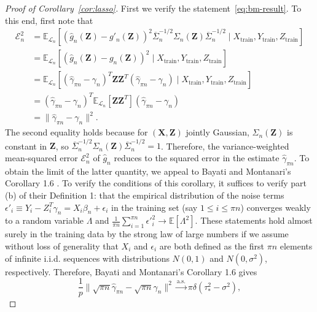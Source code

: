 \documentclass[12pt]{article}
\theoremstyle{definition}
\theoremstyle{remark}
\newcommand{\eps}{\epsilon}
\newcommand{\prx}{\bm X}
\newcommand{\srx}{X}
\newcommand{\prz}{\bm Z}
\newcommand{\srz}{Z}
\newcommand{\sry}{Y}
\newcommand{\seps}{\epsilon}
\begin{document}
\begin{proof}[Proof of Corollary~\ref{cor:lasso}]

First we verify the statement~\eqref{eq:bm-result}. To this end, first note that
\begin{equation}
	\begin{split}
		\mathcal E_n^2 &=  \mathbb E_{\mathcal L_n}[(\widehat g_n(\prz) - g'_n(\prz))^2\overline \Sigma_n^{-1/2}\Sigma_n(\prz)\overline \Sigma_n^{-1/2} \mid \srx_{\text{train}}, \sry_{\text{train}}, \srz_{\text{train}}] \\
		&= \mathbb E_{\mathcal L_n}[(\widehat g_n(\prz) - g_n(\prz))^2 \mid \srx_{\text{train}}, \sry_{\text{train}}, \srz_{\text{train}}] \\
		&= \mathbb E_{\mathcal L_n}[(\widehat \gamma_{\pi n} - \gamma_n)^T \prz \prz^T (\widehat \gamma_{\pi n} - \gamma_n) \mid \srx_{\text{train}}, \sry_{\text{train}}, \srz_{\text{train}}] \\
		&= (\widehat \gamma_{\pi n} - \gamma_n)^T\mathbb E_{\mathcal L_n}[ \prz \prz^T](\widehat \gamma_{\pi n} - \gamma_n) \\
		&= \|\widehat \gamma_{\pi n} - \gamma_n\|^2.
		\label{eq:error}
	\end{split}
\end{equation}
The second equality holds because for $(\prx, \prz)$ jointly Gaussian, $\Sigma_n(\prz)$ is constant in $\prz$, so $\overline \Sigma_n^{-1/2}\Sigma_n(\prz)\overline \Sigma_n^{-1/2} = 1$.
Therefore, the variance-weighted mean-squared error $\mathcal E_n^2$ of $\widehat g_n$ reduces to the squared error in the estimate $\widehat \gamma_{\pi n}$. To obtain the limit of the latter quantity, we appeal to Bayati and Montanari's Corollary 1.6 \cite{Bayati2011}. To verify the conditions of this corollary, it suffices to verify part (b) of their Definition 1: that the empirical distribution of the noise terms $\seps'_i \equiv \sry_i - \srz_i^T \gamma_n = \srx_i \beta_n + \seps_i$ in the training set (say $1 \leq i \leq \pi n$) converges weakly to a random variable $\Lambda$ and $\frac{1}{\pi n}\sum_{i = 1}^{\pi n} \eps'^2_i \rightarrow \mathbb E[\Lambda^2]$. These statements hold almost surely in the training data by the strong law of large numbers if we assume without loss of generality that $\srx_i$ and $\seps_i$ are both defined as the first $\pi n$ elements of infinite i.i.d. sequences with distributions $N(0,1)$ and $N(0,\sigma^2)$, respectively. Therefore, Bayati and Montanari's Corollary 1.6 gives 
\begin{equation}
	\frac{1}{p}\|\sqrt{\pi n}\widehat \gamma_{\pi n} - \sqrt{\pi n}\gamma_n\|^2 \overset{\text{a.s.}}\rightarrow \pi\delta(\tau_*^2 - \sigma^2),

\end{equation}
\end{proof}
\end{document}
